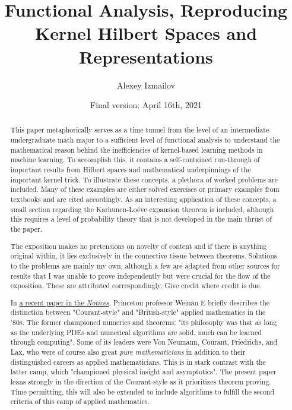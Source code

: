 \documentclass{article}
\title{Functional Analysis, Reproducing Kernel Hilbert Spaces and Representations}
\author{Alexey Izmailov}
\date{Final version: April 16th, 2021}
\theoremstyle{definition}
\theoremstyle{remark}
\numberwithin{equation}{section}
\begin{document}
\maketitle

\pagebreak

\begin{abstract}
This paper metaphorically serves as a time tunnel from the level of an intermediate undergraduate math major to a sufficient level of functional analysis to understand the mathematical reason behind the inefficiencies of kernel-based learning methods in machine learning. To accomplish this, it contains a self-contained run-through of important results from Hilbert spaces and mathematical underpinnings of the important kernel trick. To illustrate these concepts, a plethora of worked problems are included. Many of these examples are either solved exercises or primary examples from textbooks and are cited accordingly. As an interesting application of these concepts, a small section regarding the Karhunen-Lo\'{e}ve expansion theorem is included, although this requires a level of probability theory that is not developed in the main thrust of the paper. 

The exposition makes no pretensions on novelty of content and if there is anything original within, it lies exclusively in the connective tissue between theorems. Solutions to the problems are mainly my own, although a few are adapted from other sources for results that I was unable to prove independently but were crucial for the flow of the exposition. These are attributed correspondingly. Give credit where credit is due. 

In \href{https://www.ams.org/journals/notices/202104/rnoti-p565.pdf}{a recent paper in the \textit{Notices}}, Princeton professor Weinan E briefly describes the distinction between "Courant-style" and "British-style" applied mathematics in the '80s. The former championed numerics and theorems: "its philosophy was that as long as the underlying PDEs and numerical algorithms are solid, much can be learned through computing". Some of its leaders were Von Neumann, Courant, Friedrichs, and Lax, who were of course also great \textit{pure mathematicians} in addition to their distinguished careers as applied mathematicians. This is in stark contrast with the latter camp, which "championed physical insight and asymptotics". The present paper leans strongly in the direction of the Courant-style as it prioritizes theorem proving. Time permitting, this will also be extended to include algorithms to fulfill the second criteria of this camp of applied mathematics. 
\end{abstract}
\end{document}
